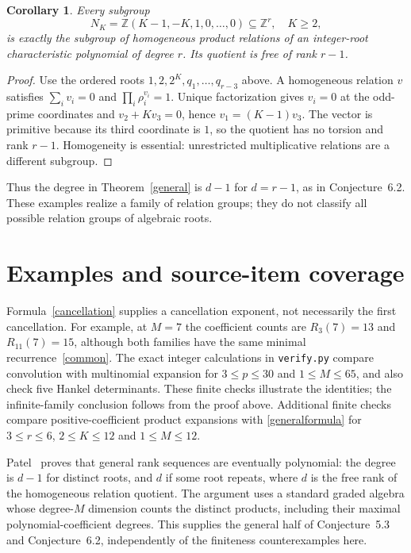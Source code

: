 \documentclass[11pt]{article}
\newtheorem{corollary}[theorem]{Corollary}
\begin{document}
\begin{corollary}\label{relations}
Every subgroup
\[
 N_K=\mathbb Z(K-1,-K,1,0,\ldots,0)\subseteq\mathbb Z^r,\quad K\geq2,
\]
is exactly the subgroup of homogeneous product relations of an
integer-root characteristic polynomial of degree $r$. Its quotient is
free of rank $r-1$.
\end{corollary}
\begin{proof}
Use the ordered roots $1,2,2^K,q_1,\ldots,q_{r-3}$ above. A homogeneous
relation $v$ satisfies $\sum_i v_i=0$ and $\prod_i\rho_i^{v_i}=1$.
Unique factorization gives $v_i=0$ at the odd-prime coordinates and
$v_2+Kv_3=0$, hence $v_1=(K-1)v_3$. The vector is primitive because
its third coordinate is $1$, so the quotient has no torsion and rank
$r-1$. Homogeneity is essential: unrestricted multiplicative relations
are a different subgroup.
\end{proof}
Thus the degree in Theorem~\ref{general} is $d-1$ for $d=r-1$, as in
Conjecture~6.2. These examples realize a family of relation groups; they
do not classify all possible relation groups of algebraic roots.

\section{Examples and source-item coverage}
Formula~\eqref{cancellation} supplies a cancellation exponent, not
necessarily the first cancellation. For example, at $M=7$ the coefficient
counts are $R_3(7)=13$ and $R_{11}(7)=15$, although both families have
the same minimal recurrence~\eqref{common}. The exact integer calculations
in \texttt{verify.py} compare convolution with multinomial expansion for
$3\leq p\leq30$ and $1\leq M\leq65$, and also check five Hankel
determinants. These finite checks illustrate the identities; the
infinite-family conclusion follows from the proof above. Additional
finite checks compare positive-coefficient product expansions with
\eqref{generalformula} for $3\leq r\leq6$, $2\leq K\leq12$ and
$1\leq M\leq12$.

Patel~\cite[equations~(17), (23)]{Patel} proves that general rank
sequences are eventually polynomial: the degree is $d-1$ for distinct
roots, and $d$ if some root repeats, where $d$ is the free rank of the
homogeneous relation quotient. The argument uses a standard graded
algebra whose degree-$M$ dimension counts the distinct products, including
their maximal polynomial-coefficient degrees. This supplies the general
half of Conjecture~5.3 and Conjecture~6.2, independently of the finiteness
counterexamples here.
\end{document}
